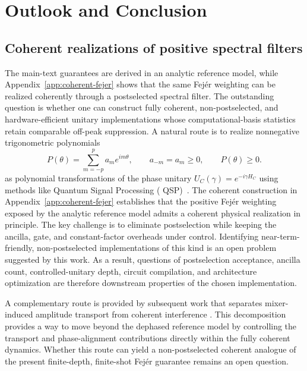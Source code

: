 \documentclass[a4paper,unpublished,onecolumn,11pt]{quantumarticle}
\theoremstyle{definition}
\theoremstyle{remark}
\begin{document}
\section{Outlook and Conclusion}
\label{sec:outlook}


\subsection{Coherent realizations of positive spectral filters}

The main-text guarantees are derived in an analytic reference model,
while Appendix~\ref{app:coherent-fejer} shows that the same Fej\'er
weighting can be realized coherently through a postselected spectral
filter. The outstanding question is whether one can construct fully
coherent, non-postselected, and hardware-efficient unitary
implementations whose computational-basis statistics retain comparable
off-peak suppression. A natural route is to realize nonnegative trigonometric polynomials
\[
P(\theta)
=
\sum_{m=-p}^{p}a_m e^{im\theta},
\qquad
a_{-m}=a_m\ge0,
\qquad
P(\theta)\ge0.
\]
as polynomial transformations of the phase unitary
$U_C(\gamma)=e^{-i\gamma H_C}$ using methods like Quantum Signal Processing (
QSP)~\cite{BerryEtAl2015Taylor,LowChuang2017QSP}. %
The coherent construction in Appendix~\ref{app:coherent-fejer} establishes that the positive Fej\'er weighting exposed
by the analytic reference model admits a coherent physical realization in
principle. The key challenge is to eliminate postselection while keeping the ancilla, gate, and constant-factor overheads under control. Identifying near-term-friendly, non-postselected implementations of this kind is an open problem suggested by this work.
 As a result, questions of postselection acceptance, ancilla count,
controlled-unitary depth, circuit compilation, and architecture
optimization are therefore downstream properties of the chosen
implementation. 

A complementary route is provided by subsequent work that separates mixer-induced amplitude transport from coherent interference
\cite{OnahHadfieldSeparatingGeometry}. This decomposition provides a
way to move beyond the dephased reference model by controlling the
transport and phase-alignment contributions directly within the fully
coherent dynamics. Whether this route can yield a non-postselected
coherent analogue of the present finite-depth, finite-shot Fej\'er guarantee remains an open question.
\end{document}
